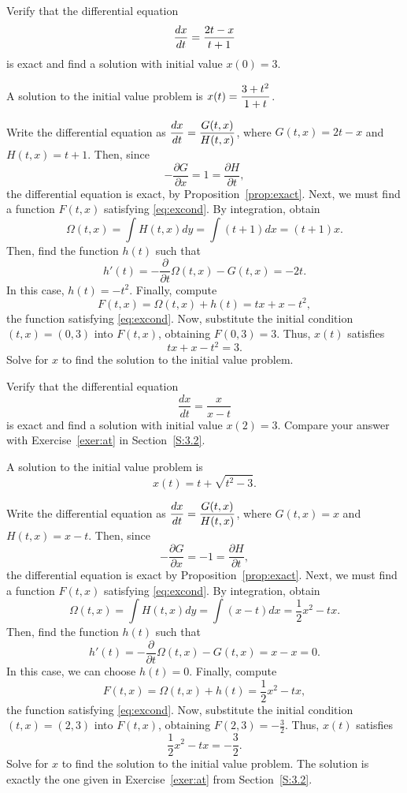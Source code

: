 \documentclass{ximera}
\begin{document}
\begin{exercise} \label{c14.6.4}
Verify that the differential equation 
\[
\displaystyle\frac{dx}{dt} = \displaystyle \frac{2t-x}{t+1} 
\]
is exact and find a solution with initial value $x(0) = 3$.

\begin{solution}
\ans A solution to the initial value problem is
$x(t) = \displaystyle\frac{3 + t^2}{1 + t}$.

\soln Write the differential equation as $\displaystyle\frac{dx}{dt} =
\frac{G(t,x)}{H(t,x)}$, where $G(t,x) = 2t - x$ and $H(t,x) = t + 1$.  Then,
since
\[
-\frac{\partial G}{\partial x} = 1 = \frac{\partial H}{\partial t},
\]
the differential equation is exact, by
Proposition~\ref{prop:exact}.  Next, we must find a function $F(t,x)$
satisfying \eqref{eq:excond}.  By integration, obtain
\[
\Omega(t,x) = \int H(t,x)dy = \int (t + 1)dx = (t + 1)x.
\]
Then, find the function $h(t)$ such that
\[
h'(t) = -\frac{\partial}{\partial t}\Omega(t,x) - G(t,x)
= -2t.
\]
In this case, $h(t) = -t^2$.  Finally, compute
\[
F(t,x) = \Omega(t,x) + h(t) = tx + x - t^2,
\]
the function satisfying \eqref{eq:excond}.  Now, substitute the initial
condition $(t,x) = (0,3)$ into $F(t,x)$, obtaining $F(0,3) = 3$.  Thus,
$x(t)$ satisfies
\[
tx + x - t^2 = 3.
\]
Solve for $x$ to find the solution to the initial value problem.

\end{solution}
\end{exercise}

\begin{exercise} \label{c14.6.6}
Verify that the differential equation 
\[
\frac{dx}{dt} = \frac{x}{x-t}
\]
is exact and find a solution with initial value $x(2)=3$.   Compare your 
answer with Exercise~\ref{exer:at} in Section~\ref{S:3.2}.

\begin{solution}
\ans A solution to the initial value problem is
\[
x(t) = t + \sqrt{t^2-3}.
\]

\soln Write the differential equation as $\displaystyle\frac{dx}{dt} =
\frac{G(t,x)}{H(t,x)}$, where $G(t,x) = x$ and $H(t,x) = x - t$.  Then,
since
\[
-\frac{\partial G}{\partial x} = -1 = \frac{\partial H}{\partial t},
\]
the differential equation is exact by Proposition~\ref{prop:exact}.  Next,
we must find a function $F(t,x)$ satisfying \eqref{eq:excond}.  By integration,
obtain
\[
\Omega(t,x) = \int H(t,x)dy = \int (x - t)dx = \frac{1}{2}x^2 -tx.
\]
Then, find the function $h(t)$ such that
\[
h'(t) = -\frac{\partial}{\partial t}\Omega(t,x) - G(t,x)
= x - x = 0 .
\]
In this case, we can choose $h(t) = 0$.  Finally, compute
\[
F(t,x) = \Omega(t,x) + h(t) =  \frac{1}{2}x^2 -tx,
\]
the function satisfying \eqref{eq:excond}.  Now, substitute the initial
condition $(t,x) = (2,3)$ into $F(t,x)$, obtaining $F(2,3) = -\frac{3}{2}$.  Thus,
$x(t)$ satisfies
\[
 \frac{1}{2}x^2 -tx = -\frac{3}{2}.
\]
Solve for $x$ to find the solution to the initial value problem.  The
solution is exactly the one given in Exercise~\ref{exer:at} from
Section~\ref{S:3.2}.


\end{solution}
\end{exercise} 
\end{document}
